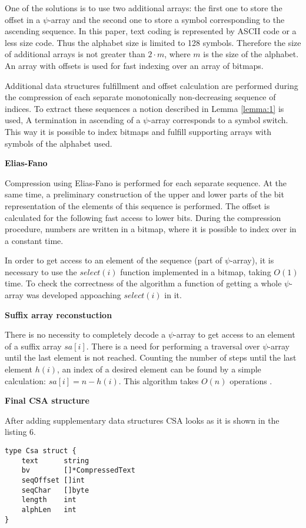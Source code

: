 One of the solutions is to use two additional arrays:
the first one to store the offset in a $\psi$-array and the second one to store a symbol
corresponding to the ascending sequence.
In this paper, text coding is represented by ASCII code or a less size code.
Thus the alphabet size is limited to 128 symbols. Therefore the size of additional arrays is not
greater than $2 \cdot m$, where $m$ is the size of the alphabet.
An array with offsets is used for fast indexing over an array of bitmaps.

Additional data structures fulfillment and offset calculation are performed during the compression
of each separate monotonically non-decreasing sequence of indices.
To extract these sequences a notion described in Lemma \ref{lemma:1} is used,
A termination in ascending of a $\psi$-array corresponds to a symbol switch.
This way it is possible to index bitmaps and fulfill supporting arrays with symbols of the alphabet used.

\textbf{Elias-Fano}

Compression using Elias-Fano is performed for each separate sequence.
At the same time, a preliminary construction of the upper and lower parts of the bit representation
of the elements of this sequence is performed. The offset is calculated for the following
fast access to lower bits. During the compression procedure, numbers are written in a bitmap,
where it is possible to index over in a constant time.

In order to get access to an element of the sequence (part of $\psi$-array), it is
necessary to use the $select(i)$ function implemented in a bitmap, taking $O(1)$ time.
To check the correctness of the algorithm a function of getting a whole $\psi$-array
was developed appoaching $select(i)$ in it.

\textbf{Suffix array reconstuction}

There is no necessity to completely decode a $\psi$-array to get access to
an element of a suffix array $sa[i]$. There is a need for performing a traversal over $\psi$-array
until the last element is not reached. Counting the number of steps until the last element $h(i)$,
an index of a desired element can be found by a simple calculation: $sa[i] = n - h(i)$.
This algorithm takes $O(n)$ operations \cite{andersensimple}.

\textbf{Final CSA structure}

After adding supplementary data structures CSA looks as it is shown in the listing 6.

\begin{lstlisting}[caption=CSA structure]
type Csa struct {
	text      string
	bv        []*CompressedText
	seqOffset []int
	seqChar   []byte
	length    int
	alphLen   int
}
\end{lstlisting}

